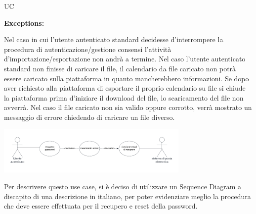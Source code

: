 \begin{listaPersonale}{UC}
\begin{listaPersonale2}[UC] {}
        \textbf{Exceptions:}
        \begin{enumerate}[label=\textbf{[exception \arabic{enumiii}]}, ref= \textbf{[exception \arabic{enumiii}]}]
             Nel caso in cui l'utente autenticato standard decidesse d'interrompere la procedura di autenticazione/gestione consensi l'attività d'importazione/esportazione non andrà a termine.
             Nel caso l'utente autenticato standard non finisse di caricare il file, il calendario da file caricato non potrà essere caricato sulla piattaforma in quanto mancherebbero informazioni.
             Se dopo aver richiesto alla piattaforma di esportare il proprio calendario su file si chiude la piattaforma prima d'iniziare il download del file, lo scaricamento del file non avverrà.
             Nel caso il file caricato non sia valido oppure corrotto, verrà mostrato un messaggio di errore chiedendo di caricare un file diverso.
        \end{enumerate}


    \end{listaPersonale2}


    \newpage

    \begin{center}
        \includegraphics[width=0.7\textwidth]{img/Diagrammi/UseCases/RecuperoPassword.png}
    \end{center}
    Per descrivere questo use case, si è deciso di utilizzare un Sequence Diagram a discapito di una descrizione in italiano, per poter evidenziare meglio la procedura che deve essere effettuata per il recupero e reset della password.


\end{listaPersonale}
